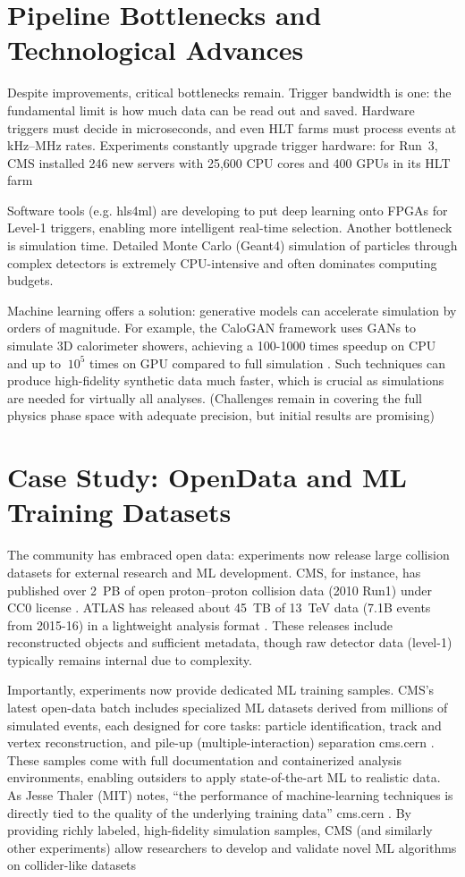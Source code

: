 \documentclass[letterpaper,12pt]{article}
\begin{document}
\begin{spacing}{1.125}
\section{Pipeline Bottlenecks and Technological Advances}

Despite improvements, critical bottlenecks remain. Trigger bandwidth is one: the fundamental limit is how much data can be read out and saved. Hardware triggers must decide in microseconds, and even HLT farms must process events at kHz–MHz rates. Experiments constantly upgrade trigger hardware: for Run 3, CMS installed 246 new servers with 25,600 CPU cores and 400 GPUs in its HLT farm

Software tools (e.g. hls4ml) are developing to put deep learning onto FPGAs for Level-1 triggers, enabling more intelligent real-time selection. Another bottleneck is simulation time. Detailed Monte Carlo (Geant4) simulation of particles through complex detectors is extremely CPU-intensive and often dominates computing budgets.

Machine learning offers a solution: generative models can accelerate simulation by orders of magnitude. For example, the CaloGAN framework uses GANs to simulate 3D calorimeter showers, achieving a 100-1000 times speedup on CPU and up to $~10^5$ times on GPU compared to full simulation
. Such techniques can produce high-fidelity synthetic data much faster, which is crucial as simulations are needed for virtually all analyses. (Challenges remain in covering the full physics phase space with adequate precision, but initial results are promising)


\section{Case Study: OpenData and ML Training Datasets}

The community has embraced open data: experiments now release large collision datasets for external research and ML development. CMS, for instance, has published over 2 PB of open proton–proton collision data (2010 Run1) under CC0 license
. ATLAS has released about 45 TB of 13 TeV data (7.1B events from 2015-16) in a lightweight analysis format
. These releases include reconstructed objects and sufficient metadata, though raw detector data (level-1) typically remains internal due to complexity.

Importantly, experiments now provide dedicated ML training samples. CMS’s latest open-data batch includes specialized ML datasets derived from millions of simulated events, each designed for core tasks: particle identification, track and vertex reconstruction, and pile-up (multiple-interaction) separation
cms.cern
. These samples come with full documentation and containerized analysis environments, enabling outsiders to apply state-of-the-art ML to realistic data. As Jesse Thaler (MIT) notes, “the performance of machine-learning techniques is directly tied to the quality of the underlying training data”
cms.cern
. By providing richly labeled, high-fidelity simulation samples, CMS (and similarly other experiments) allow researchers to develop and validate novel ML algorithms on collider-like datasets


\end{spacing}
\end{document}
